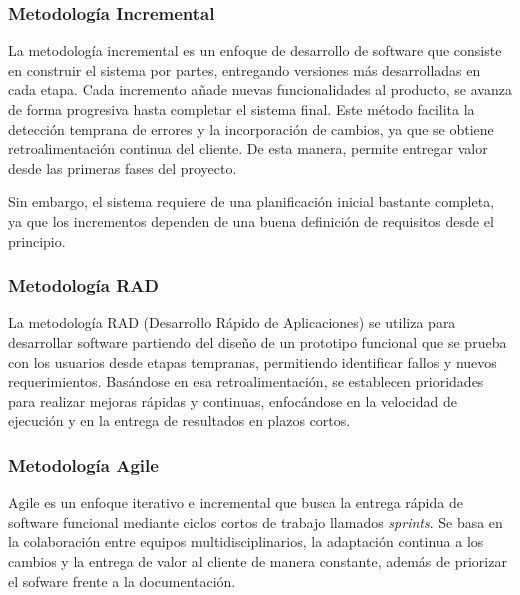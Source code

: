 \subsubsection{Metodología Incremental}

La metodología incremental es un enfoque de desarrollo de software que consiste en construir el sistema por partes, entregando versiones más desarrolladas en cada etapa. Cada incremento añade nuevas funcionalidades al producto, se avanza de forma progresiva hasta completar el sistema final. Este método facilita la detección temprana de errores y la incorporación de cambios, ya que se obtiene retroalimentación continua del cliente. De esta manera, permite entregar valor desde las primeras fases del proyecto.

Sin embargo, el sistema requiere de una planificación inicial bastante completa, ya que los incrementos dependen de una buena definición de requisitos desde el principio.\cite{incremental_ref}

\subsubsection{Metodología RAD}

La metodología RAD (Desarrollo Rápido de Aplicaciones) se utiliza para desarrollar software partiendo del diseño de un prototipo funcional que se prueba con los usuarios desde etapas tempranas, permitiendo identificar fallos y nuevos requerimientos. Basándose en esa retroalimentación, se establecen prioridades para realizar mejoras rápidas y continuas, enfocándose en la velocidad de ejecución y en la entrega de resultados en plazos cortos.\cite{rad_ref}


\subsubsection{\textbf{Metodología Agile}}

Agile es un enfoque iterativo e incremental que busca la entrega rápida de software funcional mediante ciclos cortos de trabajo llamados \textit{sprints}. Se basa en la colaboración entre equipos multidisciplinarios, la adaptación continua a los cambios y la entrega de valor al cliente de manera constante, además de priorizar el sofware frente a la documentación.

